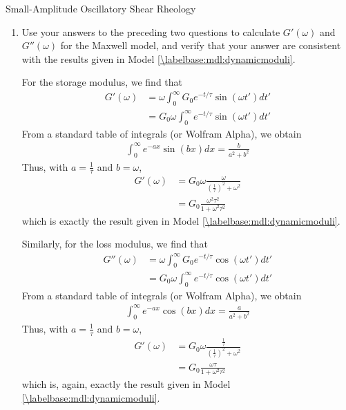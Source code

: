 \begin{activity}[extension]{Small-Amplitude Oscillatory Shear Rheology}
\begin{exercises}
\begin{enumerate}
				\item Use your answers to the preceding two questions to calculate $G'(\omega)$ and $G''(\omega)$ for the Maxwell model, and verify that your answer are consistent with the results given in Model \ref{\labelbase:mdl:dynamicmoduli}.
				
					\begin{solution}{}
					
						For the storage modulus, we find that
						\begin{align*}
							G'(\omega) &= \omega \int_0^{\infty} G_0 e^{-t/\tau} \sin(\omega t') dt'\\ 
								&= G_0 \omega \int_0^{\infty} e^{-t/\tau} \sin(\omega t') dt'
						\end{align*}
						From a standard table of integrals (or Wolfram Alpha), we obtain
						\begin{align*}
							\int_0^{\infty} e^{-ax}\sin(b x)dx = \frac{b}{a^2 + b^2}
						\end{align*}
						Thus, with $a = \frac{1}{\tau}$ and $b = \omega$,
						\begin{align*}
							G'(\omega) &= G_0 \omega \frac{\omega}{\left(\frac{1}{\tau}\right)^2 + \omega^2} \\
								&= G_0 \frac{\omega^2\tau^2}{1+\omega^2\tau^2}
						\end{align*}
						which is exactly the result given in Model \ref{\labelbase:mdl:dynamicmoduli}.
						
						\end{solution}		%
						\begin{solution}{}
						
						Similarly, for the loss modulus, we find that
						\begin{align*}
							G''(\omega) &= \omega \int_0^{\infty} G_0 e^{-t/\tau} \cos(\omega t') dt'\\ 
								&= G_0 \omega \int_0^{\infty} e^{-t/\tau} \cos(\omega t') dt'
						\end{align*}
						From a standard table of integrals (or Wolfram Alpha), we obtain
						\begin{align*}
							\int_0^{\infty} e^{-ax}\cos(b x)dx = \frac{a}{a^2 + b^2}
						\end{align*}
						Thus, with $a = \frac{1}{\tau}$ and $b = \omega$,
						\begin{align*}
							G'(\omega) &= G_0 \omega \frac{\frac{1}{\tau}}{\left(\frac{1}{\tau}\right)^2 + \omega^2} \\
								&= G_0 \frac{\omega\tau}{1+\omega^2\tau^2}
						\end{align*}
						which is, again, exactly the result given in Model \ref{\labelbase:mdl:dynamicmoduli}.
						
						
					\end{solution}
				
			\end{enumerate}

		
		
\end{exercises}
	
\end{activity}